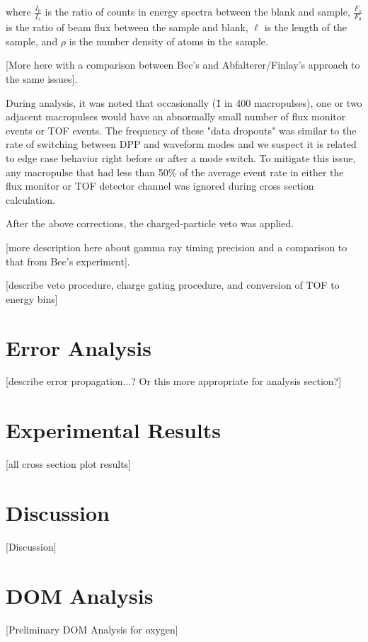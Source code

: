 \documentclass[twocolumn,secnumarabic,amssymb, nobibnotes, aps, prl,
superscriptaddress, nobalancelastpage]{revtex4}
\begin{document}
where $\frac{I_{0}}{I_{s}}$ is the ratio of counts in energy spectra between 
the blank and sample, $\frac{F_{s}}{F_{0}}$ is the ratio of beam flux
between the sample and blank, $\ell$ is the length of the sample, and $\rho$ is the
number density of atoms in the sample.

[More here with a comparison between Bec's and Abfalterer/Finlay's approach to
the same issues].

During analysis, it was noted that occasionally (\~1 in 400 macropulses), one or two 
adjacent macropulses would have an abnormally small number of flux monitor events or 
TOF events. The frequency of these "data dropouts" was similar to the rate of
switching between DPP and waveform modes and we suspect it is related to edge
case behavior right before or after a mode switch. To mitigate this issue,
any macropulse that had less than 50\% of the average event rate in either the
flux monitor or TOF detector channel was ignored during cross section calculation.

After the above corrections, the charged-particle veto was applied. 

[more description here about gamma ray timing precision and a comparison to
that from Bec's experiment].

[describe veto procedure, charge gating procedure, and conversion of TOF to
energy bins]

\section{Error Analysis}

[describe error propagation...? Or this more appropriate for analysis section?]

\section{Experimental Results}

[all cross section plot results]

\section{Discussion}

[Discussion]

\section{DOM Analysis}

[Preliminary DOM Analysis for oxygen]
\end{document}
